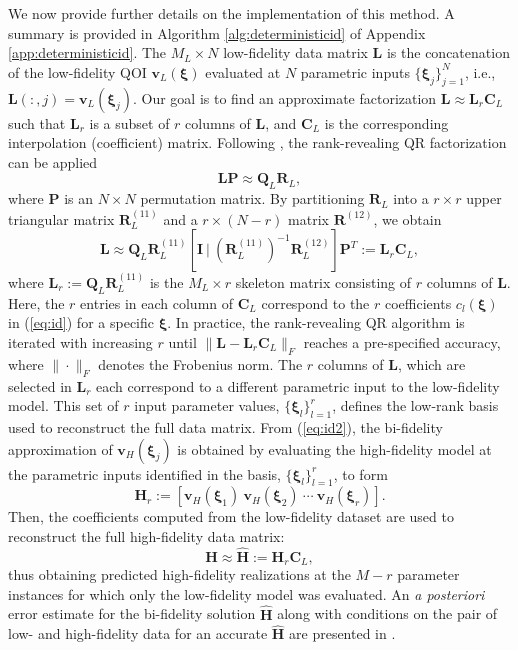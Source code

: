 \documentclass[preprint,10pt]{elsarticle}
\begin{document}
We now provide further details on the implementation of this method. A summary is provided in Algorithm \ref{alg:deterministicid} of Appendix \ref{app:deterministicid}. 
The $M_L \times N$ low-fidelity data matrix $\bm L$ is the concatenation of the low-fidelity QOI $\boldsymbol v_L(\boldsymbol\xi)$ evaluated at $N$ parametric inputs $\{ \boldsymbol \xi_j \}_{j=1}^N$, i.e., $\bm{L}(:,j) = \bm{v}_L(\bm\xi_j)$. Our goal is to find an approximate factorization $\bm L \approx \bm L_r \bm C_L$ such that $\bm L_r$ is a subset of $r$ columns of $\bm L$, and $\bm C_L$ is the corresponding interpolation (coefficient) matrix. Following \cite{doostan2016bi}, the rank-revealing QR factorization can be applied
%
\begin{equation}
    \bm L \bm P \approx \bm Q_L \bm R_L,
\end{equation}
%
where $\bm P$ is an $N \times N$ permutation matrix. By partitioning $\bm R_L$ into a $r \times r$ upper triangular matrix $\bm R_L^{(11)}$ and a $r \times (N-r)$ matrix $\bm R^{(12)}$, we obtain
%
\begin{equation}
    \bm L \approx \bm Q_L \bm R_L^{(11)} \left[ \bm I \ | \ \left(\bm R_L^{(11)}\right)^{-1} \bm R_L^{(12)} \right]\bm P^T := \bm L_r \bm C_L,
\end{equation}
%
where $\bm L_r:=\bm Q_L \bm R_L^{(11)}$ is the $M_L \times r$ skeleton matrix consisting of $r$ columns of $\bm L$. %
Here, the $r$ entries in each column of $\bm C_L$ correspond to the $r$ coefficients $c_l(\bm \xi)$ in (\ref{eq:id}) for a specific $\bm \xi$.
In practice, the rank-revealing QR algorithm is iterated with increasing $r$ until $\| \bm L - \bm L_r \bm C_L \|_F$ reaches a pre-specified accuracy, where $\| \cdot\|_F$ denotes the Frobenius norm. 
The $r$ columns of $\bm L$, which are selected in $\bm L_r$ each correspond to a different parametric input to the low-fidelity model. This set of $r$ input parameter values, $\{ \boldsymbol \xi_l \}_{l=1}^r$, defines the low-rank basis used to reconstruct the full data matrix. From (\ref{eq:id2}), the bi-fidelity approximation of $\boldsymbol v_H(\boldsymbol\xi_j)$ is obtained by evaluating the high-fidelity model at the parametric inputs identified in the basis, $\{ \boldsymbol \xi_l \}_{l=1}^r$, to form %
\begin{equation}
\label{eq:hr}
    \bm H_r := \left[ \boldsymbol v_H(\boldsymbol\xi_1) \ \boldsymbol v_H(\boldsymbol\xi_2) \ \cdots \ \boldsymbol v_H(\boldsymbol\xi_r) \right].
\end{equation}
Then, the coefficients computed from the low-fidelity dataset are used to reconstruct the full high-fidelity data matrix:
\begin{equation}
    \bm H \approx \widehat{\bm H} := \bm H_r \bm C_L,
\end{equation}
thus obtaining predicted high-fidelity realizations at the $M - r$ parameter instances for which only the low-fidelity model was evaluated. An {\it a posteriori} error estimate for the bi-fidelity solution $ \widehat{\bm H}$ along with conditions on the pair of low- and high-fidelity data for an accurate $\widehat{\bm H}$ are presented in \cite{hampton2018}. 
\end{document}
